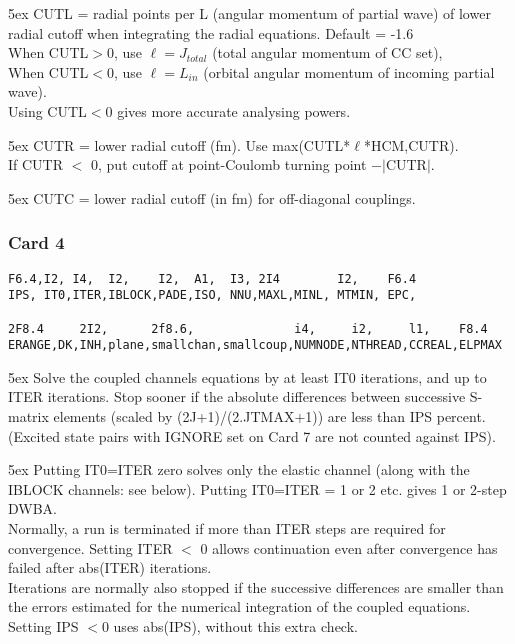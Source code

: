 \documentclass[11pt]{article}
\begin{document}
\hangindent 5ex
CUTL = radial points per L (angular momentum of partial wave)
of lower radial cutoff when integrating the radial equations. Default = -1.6\\
When CUTL$>$0, use $\ell=J_{total}$ (total angular momentum of CC set),\\
When CUTL$<$0, use $\ell=L_{in}$ (orbital angular momentum of incoming partial wave).\\
Using  CUTL$<$0 gives more accurate analysing powers.

\hangindent 5ex
CUTR = lower radial cutoff (fm).  Use max(CUTL*$\ell$*HCM,CUTR).\\
If CUTR $<$ 0, put cutoff at point-Coulomb turning point $- |$CUTR$|$.

\hangindent 5ex
CUTC = lower radial cutoff (in fm) for off-diagonal couplings.
\bigskip

\subsubsection*{Card 4}
\begin{verbatim}
F6.4,I2, I4,  I2,    I2,  A1,  I3, 2I4        I2,    F6.4
IPS, IT0,ITER,IBLOCK,PADE,ISO, NNU,MAXL,MINL, MTMIN, EPC,

2F8.4     2I2,      2f8.6,              i4,     i2,     l1,    F8.4
ERANGE,DK,INH,plane,smallchan,smallcoup,NUMNODE,NTHREAD,CCREAL,ELPMAX
\end{verbatim}


\hangindent 5ex
Solve the coupled channels equations by at least IT0 iterations, and
up to ITER iterations.
Stop sooner if the absolute differences between successive S-matrix
elements (scaled by (2J+1)/(2.JTMAX+1)) are less than IPS percent.
(Excited state pairs with IGNORE set on Card 7
are not counted against IPS).

\hangindent 5ex
Putting IT0=ITER zero solves only the elastic channel (along with the
IBLOCK channels: see below).
Putting IT0=ITER = 1 or 2 etc. gives 1 or 2-step DWBA.
\\
Normally, a run is terminated if more than ITER steps are required for
convergence. Setting ITER $<$ 0 allows continuation even after
convergence has failed after abs(ITER) iterations.
\\
Iterations are normally also stopped if the successive differences are smaller
than the errors estimated for the numerical integration of the coupled
equations. Setting IPS $< 0$ uses abs(IPS), without this extra check.
\end{document}
